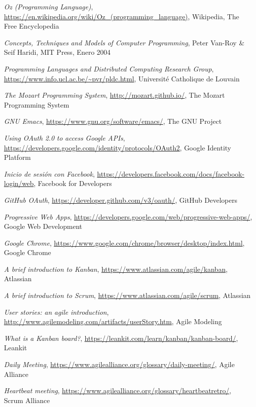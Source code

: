 \documentclass[a4paper,11pt]{article}
\begin{document}
\begin{thebibliography}{99}

    \emph{Oz (Programming Language)},
    \url{https://en.wikipedia.org/wiki/Oz_(programming_language)},
    Wikipedia, The Free Encyclopedia

    \emph{Concepts, Techniques and Models of Computer Programming},
    Peter Van-Roy \& Seif Haridi,
    MIT Press,
    Enero 2004

    \emph{Programming Languages and Distributed Computing Research Group},
    \url{https://www.info.ucl.ac.be/~pvr/pldc.html},
    Université Catholique de Louvain

    \emph{The Mozart Programming System},
    \url{http://mozart.github.io/},
    The Mozart Programming System

    \emph{GNU Emacs},
    \url{https://www.gnu.org/software/emacs/},
    The GNU Project

    \emph{Using OAuth 2.0 to access Google APIs},
    \url{https://developers.google.com/identity/protocols/OAuth2},
    Google Identity Platform

    \emph{Inicio de sesión con Facebook},
    \url{https://developers.facebook.com/docs/facebook-login/web},
    Facebook for Developers

    \emph{GitHub OAuth},
    \url{https://developer.github.com/v3/oauth/},
    GitHub Developers

    \emph{Progressive Web Apps},
    \url{https://developers.google.com/web/progressive-web-apps/},
    Google Web Development

    \emph{Google Chrome},
    \url{https://www.google.com/chrome/browser/desktop/index.html},
    Google Chrome

    \emph{A brief introduction to Kanban},
    \url{https://www.atlassian.com/agile/kanban},
    Atlassian

    \emph{A brief introduction to Scrum},
    \url{https://www.atlassian.com/agile/scrum},
    Atlassian

    \emph{User stories: an agile introduction},
    \url{http://www.agilemodeling.com/artifacts/userStory.htm},
    Agile Modeling

    \emph{What is a Kanban board?},
    \url{https://leankit.com/learn/kanban/kanban-board/},
    Leankit

    \emph{Daily Meeting},
    \url{https://www.agilealliance.org/glossary/daily-meeting/},
    Agile Alliance

    \emph{Heartbeat meeting},
    \url{https://www.agilealliance.org/glossary/heartbeatretro/},
    Scrum Alliance

\end{thebibliography}
\end{document}
